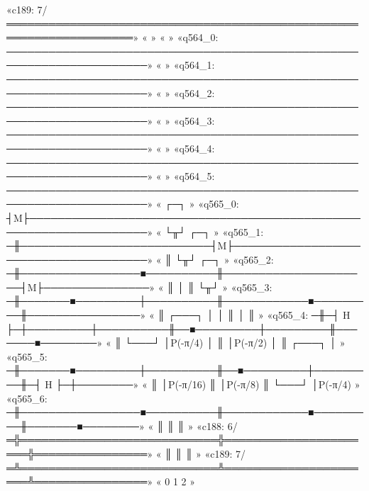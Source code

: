 «c189: 7/════════════════════════════════════════════════════════════════════»
«                                                                            »
«                                                                              »
«q564_0: ──────────────────────────────────────────────────────────────────────»
«                                                                              »
«q564_1: ──────────────────────────────────────────────────────────────────────»
«                                                                              »
«q564_2: ──────────────────────────────────────────────────────────────────────»
«                                                                              »
«q564_3: ──────────────────────────────────────────────────────────────────────»
«                                                                              »
«q564_4: ──────────────────────────────────────────────────────────────────────»
«                                                                              »
«q564_5: ──────────────────────────────────────────────────────────────────────»
«        ┌─┐                                                                   »
«q565_0: ┤M├───────────────────────────────────────────────────────────────────»
«        └╥┘                          ┌─┐                                      »
«q565_1: ─╫───────────────────────────┤M├──────────────────────────────────────»
«         ║                           └╥┘                    ┌─┐               »
«q565_2: ─╫─────────────────■──────────╫─────────────────────┤M├───────────────»
«         ║                 │          ║                     └╥┘               »
«q565_3: ─╫───────■─────────┼──────────╫────────────■─────────╫────────────────»
«         ║ ┌───┐ │         │          ║            │         ║                »
«q565_4: ─╫─┤ H ├─┼─────────┼──────────╫──■─────────┼─────────╫───────■────────»
«         ║ └───┘ │P(-π/4)  │          ║  │P(-π/2)  │         ║ ┌───┐ │        »
«q565_5: ─╫───────■─────────┼──────────╫──■─────────┼─────────╫─┤ H ├─┼────────»
«         ║                 │P(-π/16)  ║            │P(-π/8)  ║ └───┘ │P(-π/4) »
«q565_6: ─╫─────────────────■──────────╫────────────■─────────╫───────■────────»
«         ║                            ║                      ║                »
«c188: 6/═╬════════════════════════════╬══════════════════════╬════════════════»
«         ║                            ║                      ║                »
«c189: 7/═╩════════════════════════════╩══════════════════════╩════════════════»
«         0                            1                      2                »
